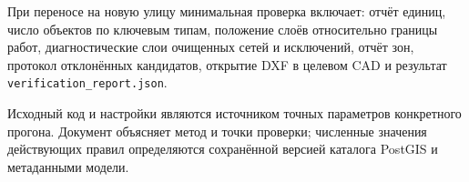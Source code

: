 \documentclass[11pt,a4paper]{article}
\newcommand{\code}[1]{\texttt{#1}}
\begin{document}
При переносе на новую улицу минимальная проверка включает: отчёт единиц, число объектов по ключевым типам, положение слоёв относительно границы работ, диагностические слои очищенных сетей и исключений, отчёт зон, протокол отклонённых кандидатов, открытие DXF в целевом CAD и результат \code{verification\_report.json}.

\vfill
{\small\color{muted}Исходный код и настройки являются источником точных параметров конкретного прогона. Документ объясняет метод и точки проверки; численные значения действующих правил определяются сохранённой версией каталога PostGIS и метаданными модели.}
\end{document}
